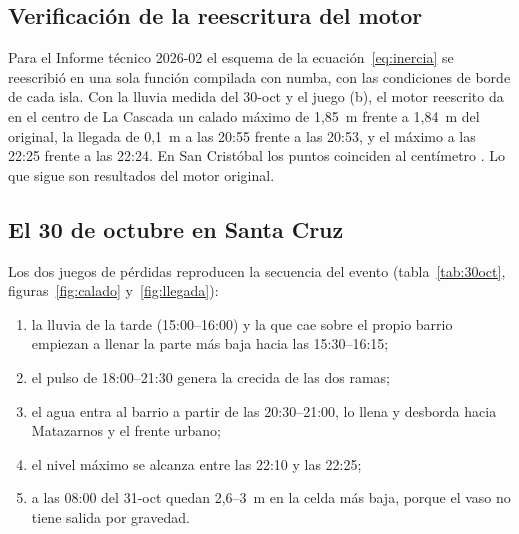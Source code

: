 \documentclass{sosg-informe}
\begin{document}
\subsection{Verificación de la reescritura del motor}\label{sec:reescritura}
Para el Informe técnico 2026-02 el esquema de la ecuación~\ref{eq:inercia} se reescribió en una sola función compilada con numba, con las condiciones de borde de cada isla. Con la lluvia medida del 30-oct y el juego (b), el motor reescrito da en el centro de La Cascada un calado máximo de 1,85~m frente a 1,84~m del original, la llegada de 0,1~m a las 20:55 frente a las 20:53, y el máximo a las 22:25 frente a las 22:24. En San Cristóbal los puntos coinciden al centímetro \citep{sosg202602}. Lo que sigue son resultados del motor original.

\subsection{El 30 de octubre en Santa Cruz}
Los dos juegos de pérdidas reproducen la secuencia del evento (tabla~\ref{tab:30oct}, figuras~\ref{fig:calado} y~\ref{fig:llegada}):
\begin{enumerate}
  \item la lluvia de la tarde (15:00--16:00) y la que cae sobre el propio barrio empiezan a llenar la parte más baja hacia las 15:30--16:15;
  \item el pulso de 18:00--21:30 genera la crecida de las dos ramas;
  \item el agua entra al barrio a partir de las 20:30--21:00, lo llena y desborda hacia Matazarnos y el frente urbano;
  \item el nivel máximo se alcanza entre las 22:10 y las 22:25;
  \item a las 08:00 del 31-oct quedan 2,6--3~m en la celda más baja, porque el vaso no tiene salida por gravedad.
\end{enumerate}
\end{document}
